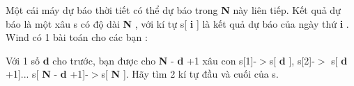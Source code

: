 Một cái máy dự báo thời tiết có thể dự báo trong   \textbf{    N   }   này liên tiếp. Kết quả dự báo là một xâu s có độ dài   \textbf{    N   }   , với kí tự s[   \textbf{    i   }   ] là kết quả dự báo của ngày thứ   \textbf{    i   }   . Wind có 1 bài toán cho các bạn :  

   Với 1 số   \textbf{    d   }   cho trước, bạn được cho   \textbf{    N   }   -   \textbf{    d   }   +1 xâu con s[1]-$>$s[   \textbf{    d   }   ], s[2]-$>$ s[   \textbf{    d   }   +1]... s[   \textbf{    N   }   -   \textbf{    d   }   +1]-$>$s[   \textbf{    N   }   ]. Hãy tìm 2 kí tự đầu và cuối của s.